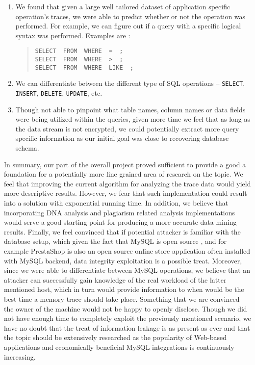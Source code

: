 \documentclass[11pt, oneside]{article}
\begin{document}
\begin{enumerate}
\item We found that given a large well tailored dataset of application 
specific operation's traces, we were able to predict whether or not the 
operation was performed. For example, we can figure out if a query with a 
specific logical syntax was performed. Examples are :
\def\smalldash{\underbar{\hskip .3in}~}
\begin{quote}
{\tt SELECT \smalldash FROM \smalldash WHERE \smalldash = \smalldash;} \\
{\tt SELECT \smalldash FROM \smalldash WHERE \smalldash > \smalldash;} \\
{\tt SELECT \smalldash FROM \smalldash WHERE \smalldash LIKE \smalldash;}
\end{quote}
\item We can differentiate between the different type of SQL operations – 
{\tt SELECT}, {\tt INSERT}, {\tt DELETE}, {\tt UPDATE}, etc.
      
\item Though not able to pinpoint what table names, column names or data 
fields were being utilized within the queries, given more time we feel that as 
long as the data stream is not encrypted, we could potentially extract more 
query specific information as our initial goal was close to recovering 
database schema.
\end{enumerate}

In summary, our part of the overall project proved sufficient to provide a 
good a foundation for a potentially more fine grained area of research on the 
topic. We feel that improving the current algorithm for analyzing the trace 
data would yield more descriptive results. However, we fear that such 
implementation could result into a solution with exponential running time. In 
addition, we believe that incorporating DNA analysis and plagiarism related 
analysis implementations would serve a good starting point for producing a 
more accurate data mining results. Finally, we feel convinced that if 
potential attacker is familiar with the database setup, which given the fact 
that MySQL is open source , and for example PrestaShop is also an open source 
online store application often installed with MySQL backend, data integrity 
exploitation is a possible treat. Moreover, since we were able to 
differentiate between MySQL operations, we believe that an attacker can 
successfully gain knowledge of the real workload of the latter mentioned host, 
which in turn would provide information to when would be the best time a 
memory trace should take place. Something that we are convinced the owner of 
the machine would not be happy to openly disclose. Though we did not have 
enough time to completely exploit the previously mentioned scenario, we have 
no doubt that the treat of information leakage is as present as ever and that 
the topic should be extensively researched as the popularity of Web-based 
applications and economically beneficial MySQL integrations is continuously 
increasing.
\end{document}
